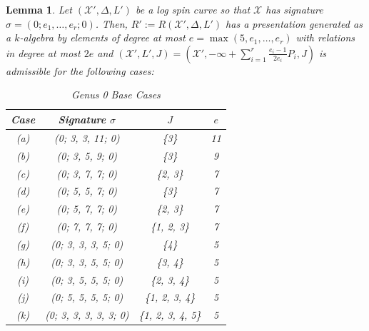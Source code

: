 \documentclass{amsart}
\theoremstyle{plain}
\newtheorem{lem}[thm]{Lemma}
\theoremstyle{definition}
\theoremstyle{remark}
\numberwithin{equation}{section}
\newcommand \sx{\mathscr X}
\newcommand \subhalf[1]{\frac{{#1} - 1}{2{#1}}}
\newcommand \halfcan{L}
\begin{document}
\begin{lem}
\label{lem:g-0-admissible-cases}
Let $(\sx', \Delta, \halfcan')$ be a log spin curve so that $\sx$ has signature $\sigma = (0; e_1,
\ldots, e_r; 0)$. Then, $R' := R(\sx', \Delta, \halfcan')$ has a
presentation generated as a $k$-algebra by elements of degree at most $e = \max(5
, e_1, \ldots, e_r)$ with relations in degree at most $2e$ and $(\sx
', \halfcan', J) =(\sx
', -\infty + \sum_{i=1}^{r}\subhalf{e_i}P_i, J)$ is admissible for the following cases:

\begin{longtable}
	{| c || c | c | c |}
	\caption{Genus 0 Base Cases}
	\label{table:g-0-base-cases}
	
	\tabularnewline
	
	\hline
	Case & Signature $\sigma$ & $J$ & $e$\\
	\hline
	\hline

	(a) & (0; 3, 3, 11; 0) & \{3\} & 11\\	\hline

	(b) & (0; 3, 5, 9; 0) & \{3\}	& 9\\ \hline

	(c) & (0; 3, 7, 7; 0) & \{2, 3\}	& 7\\ \hline
	
	(d) & (0; 5, 5, 7; 0) & \{3\}	& 7\\ \hline
	
	(e) & (0; 5, 7, 7; 0) & \{2, 3\}	& 7\\ \hline
	
	(f) & (0; 7, 7, 7; 0) & \{1, 2, 3\}	& 7\\ \hline

	(g) & (0; 3, 3, 3, 5; 0) & \{4\} & 5\\ \hline
	
	(h) & (0; 3, 3, 5, 5; 0) & \{3, 4\} & 5\\ \hline
	
	(i) & (0; 3, 5, 5, 5; 0) & \{2, 3, 4\} & 5\\ \hline
	
	(j) & (0; 5, 5, 5, 5; 0) & \{1, 2, 3, 4\} & 5\\ \hline

	(k) &	(0; 3, 3, 3, 3, 3; 0) & \{1, 2, 3, 4, 5\} & 5\\ \hline
\end{longtable}


\end{lem}
\end{document}
